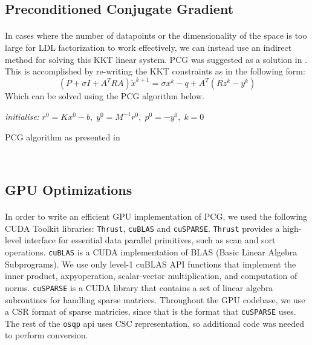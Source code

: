 \documentclass[justified,nobib]{tufte-handout}
\begin{document}
\begin{fullwidth}
\subsection{Preconditioned Conjugate Gradient}
\paragraph{}
In cases where the number of datapoints or the dimensionality of the space is too large for LDL factorization to work effectively, we can instead use an indirect method for solving this KKT linear system. PCG was suggested as a solution in \cite{cuosqp}. This is accomplished by re-writing the KKT constraints as in the following form:
\begin{equation}
(P + \sigma I + A^TRA)\tilde{x}^{k+1} = \sigma x^k - q + A^T(Rz^k-y^k)
\end{equation}
Which can be solved using the PCG algorithm below. 
\begin{algorithm}[htp]
\SetAlgoLined
\textit{initialise:}
 $r^0 = Kx^0 -b, \; y^0 = M^{-1}r^0, \; p^0 = -y^0, \; k = 0 $
 \\  \caption{PCG algorithm as presented in \cite{cuosqp}}
\end{algorithm}\\

\subsection{GPU Optimizations}
\paragraph{}
In order to write an efficient GPU implementation of PCG, we used the following CUDA Toolkit libraries: \texttt{Thrust}, \texttt{cuBLAS} and \texttt{cuSPARSE}. \texttt{Thrust} provides a high-level interface for essential data parallel primitives, such as scan and sort operations. \texttt{cuBLAS} is a CUDA implementation of BLAS (Basic Linear Algebra Subprograms). We use only level-1 cuBLAS API functions that implement the inner product, axpyoperation, scalar-vector multiplication, and computation of norms. \texttt{cuSPARSE} is a CUDA library that contains a set of linear algebra subroutines for handling sparse matrices. Throughout the GPU codebase, we use a CSR format of sparse matricies, since that is the format that \texttt{cuSPARSE} uses. The rest of the \texttt{osqp} api uses CSC representation, so additional code was needed to perform conversion. 

\end{fullwidth}
\end{document}
